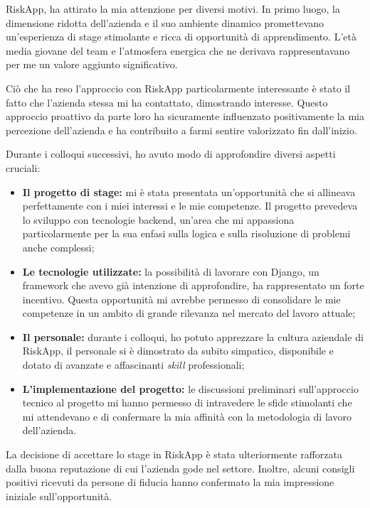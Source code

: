 RiskApp, ha attirato la mia attenzione per diversi motivi. In primo luogo, la dimensione ridotta dell'azienda e il suo ambiente dinamico promettevano un'esperienza di stage stimolante e ricca di opportunità di apprendimento. L'età media giovane del team e l'atmosfera energica che ne derivava rappresentavano per me un valore aggiunto significativo.

Ciò che ha reso l'approccio con RiskApp particolarmente interessante è stato il fatto che l'azienda stessa mi ha contattato, dimostrando interesse. Questo approccio proattivo da parte loro ha sicuramente influenzato positivamente la mia percezione dell'azienda e ha contribuito a farmi sentire valorizzato fin dall'inizio.

Durante i colloqui successivi, ho avuto modo di approfondire diversi aspetti cruciali:

\begin{itemize}
	\item \textbf{Il progetto di stage:} mi è stata presentata un'opportunità che si allineava perfettamente con i miei interessi e le mie competenze. Il progetto prevedeva lo sviluppo con tecnologie backend, un'area che mi appassiona particolarmente per la sua enfasi sulla logica e sulla risoluzione di problemi anche complessi;
	\item \textbf{Le tecnologie utilizzate:} la possibilità di lavorare con Django, un framework che avevo già intenzione di approfondire, ha rappresentato un forte incentivo. Questa opportunità mi avrebbe permesso di consolidare le mie competenze in un ambito di grande rilevanza nel mercato del lavoro attuale;
	\item \textbf{Il personale:} durante i colloqui, ho potuto apprezzare la cultura aziendale di RiskApp, il personale si è dimostrato da subito simpatico, disponibile e dotato di avanzate e affascinanti \textit{skill} professionali;
	\item \textbf{L'implementazione del progetto:} le discussioni preliminari sull'approccio tecnico al progetto mi hanno permesso di intravedere le sfide stimolanti che mi attendevano e di confermare la mia affinità con la metodologia di lavoro dell'azienda.
\end{itemize}

La decisione di accettare lo stage in RiskApp è stata ulteriormente rafforzata dalla buona reputazione di cui l'azienda gode nel settore. Inoltre, alcuni consigli positivi ricevuti da persone di fiducia hanno confermato la mia impressione iniziale sull'opportunità.

